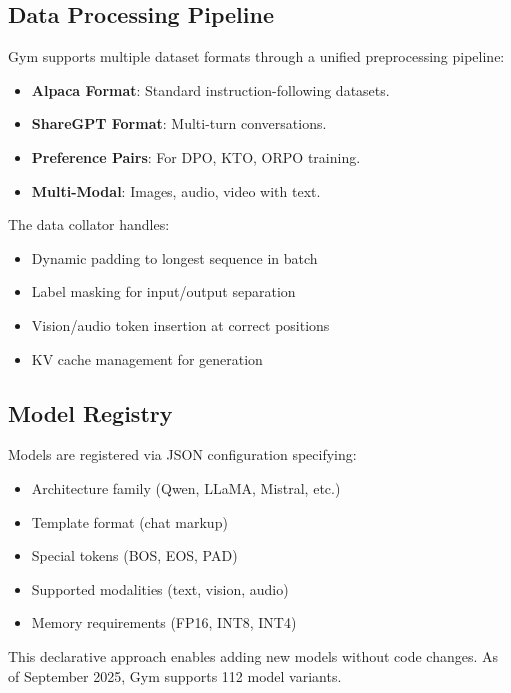 \subsection{Data Processing Pipeline}

Gym supports multiple dataset formats through a unified preprocessing pipeline:

\begin{itemize}
\item \textbf{Alpaca Format}: Standard instruction-following datasets.
\item \textbf{ShareGPT Format}: Multi-turn conversations.
\item \textbf{Preference Pairs}: For DPO, KTO, ORPO training.
\item \textbf{Multi-Modal}: Images, audio, video with text.
\end{itemize}

The data collator handles:
\begin{itemize}
\item Dynamic padding to longest sequence in batch
\item Label masking for input/output separation
\item Vision/audio token insertion at correct positions
\item KV cache management for generation
\end{itemize}

\subsection{Model Registry}

Models are registered via JSON configuration specifying:
\begin{itemize}
\item Architecture family (Qwen, LLaMA, Mistral, etc.)
\item Template format (chat markup)
\item Special tokens (BOS, EOS, PAD)
\item Supported modalities (text, vision, audio)
\item Memory requirements (FP16, INT8, INT4)
\end{itemize}

This declarative approach enables adding new models without code changes. As of September 2025, Gym supports 112 model variants.

